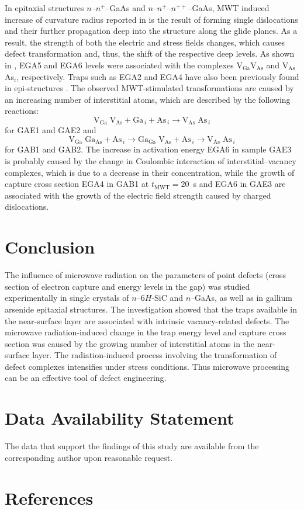 \documentclass[10pt]{iopart}
\begin{document}
In epitaxial structures $n$--$n^+$--GaAs and $n$--$n^+$--$n^{++}$--GaAs,
MWT induced increase of curvature radius reported in \cite{BoltovetsEn,Konakova2012FTPEn}
is the result of forming single dislocations and their further propagation deep into the structure along the glide planes.
As a result, the strength of both the electric and stress fields changes,
which causes defect transformation and, thus, the shift of the respective deep levels.
As shown in , EGA5 and EGA6 levels were associated with the complexes   V$_\mathrm{Ga}$V$_\mathrm{As}$  and V$_\mathrm{As}$As$_i$, respectively.
Traps such as EGA2 and EGA4 have also been previously found in epi-structures \cite{Yousefi1995,Mircea1975,Bourgoin:GaAs,ASHBY:GaAs,Fang:EL6,Lefevre1977,KolFTP1989En}.
The observed MWT-stimulated transformations are caused by an increasing number of interstitial atoms, which are described by the following reactions: \begin{equation*}
  \mathrm{V}_\mathrm{Ga}\;\mathrm{V}_\mathrm{As}+\mathrm{Ga}_{\,i}+\mathrm{As}_{\,i} \rightarrow \mathrm{V}_\mathrm{As}\;\mathrm{As}_{\,i}
\end{equation*}
for GAE1 and GAE2 and
\begin{equation*}
  \mathrm{V}_\mathrm{Ga}\;\mathrm{Ga}_\mathrm{As}+\mathrm{As}_{\,i} \rightarrow
  \mathrm{Ga}_\mathrm{Ga}\;\mathrm{V}_\mathrm{As}+\mathrm{As}_{\,i} \rightarrow
  \mathrm{V}_\mathrm{As}\;\mathrm{As}_{\,i}
\end{equation*}
for GAB1 and GAB2.
The increase in activation energy EGA6 in sample GAE3 is probably caused by the change in
Coulombic interaction of interstitial--vacancy complexes,
which is due to a decrease in their concentration,
while the growth of capture cross section EGA4 in GAB1 at $t_\mathrm{MWT}=20$~s
and EGA6 in GAE3 are associated with the growth of the electric field strength caused by charged dislocations.

\section{Conclusion}
The influence of microwave radiation on the parameters of point defects (cross section of electron capture and energy levels in the gap)
was studied experimentally  in single crystals of $n$–6$H$-SiC and  $n$–GaAs, as well as in gallium arsenide epitaxial structures.
The investigation showed that the traps available in the near-surface layer are associated with intrinsic
vacancy-related defects.
The microwave radiation-induced change in the trap energy level and capture cross section
was caused by the growing number of interstitial atoms in the near-surface layer.
The radiation-induced process involving the transformation of defect complexes intensifies under stress conditions.
Thus microwave processing can be an effective tool of defect engineering.

\section*{Data Availability Statement}

The data that support the findings of this study are available from the corresponding author upon reasonable request.

\section*{References}



\end{document}
